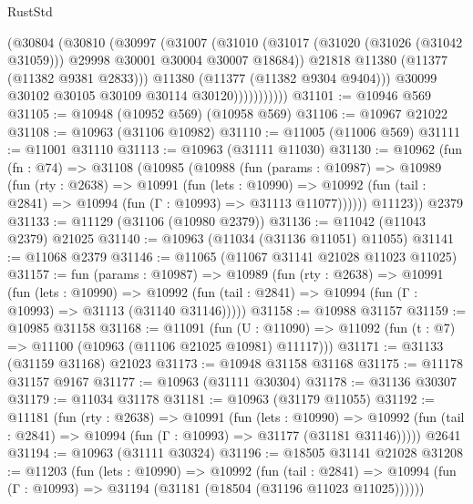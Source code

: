 \begin{lexlean}{RustStd}
\begin{coremodule}
                      (@30804
                        (@30810
                          (@30997
                            (@31007
                              (@31010
                                (@31017
                                  (@31020 (@31026 (@31042 @31059)))
                                  @29998
                                  @30001
                                  @30004
                                  @30007
                                  @18684))
                              @21818
                              @11380
                              (@11377 (@11382 @9381 @2833)))
                            @11380
                            (@11377 (@11382 @9304 @9404)))
                          @30099
                          @30102
                          @30105
                          @30109
                          @30114
                          @30120)))))))))))
@31101 := @10946 @569
@31105 := @10948 (@10952 @569) (@10958 @569)
@31106 := @10967 @21022
@31108 := @10963 (@31106 @10982)
@31110 := @11005 (@11006 @569)
@31111 := @11001 @31110
@31113 := @10963 (@31111 @11030)
@31130 := @10962
    (fun (fn : @74) =>
    @31108
      (@10985
        (@10988
          (fun (params : @10987) =>
          @10989
            (fun (rty : @2638) =>
            @10991
              (fun (lets : @10990) =>
              @10992 (fun (tail : @2841) => @10994 (fun (Γ : @10993) => @31113 @11077))))))
        @11123))
    @2379
@31133 := @11129 (@31106 (@10980 @2379))
@31136 := @11042 (@11043 @2379) @21025
@31140 := @10963 (@11034 (@31136 @11051) @11055)
@31141 := @11068 @2379
@31146 := @11065 (@11067 @31141 @21028 @11023 @11025)
@31157 := fun (params : @10987) =>
  @10989
    (fun (rty : @2638) =>
    @10991
      (fun (lets : @10990) =>
      @10992 (fun (tail : @2841) => @10994 (fun (Γ : @10993) => @31113 (@31140 @31146)))))
@31158 := @10988 @31157
@31159 := @10985 @31158
@31168 := @11091
    (fun (U : @11090) => @11092 (fun (t : @7) => @11100 (@10963 (@11106 @21025 @10981) @11117)))
@31171 := @31133 (@31159 @31168) @21023
@31173 := @10948 @31158 @31168
@31175 := @11178 @31157 @9167
@31177 := @10963 (@31111 @30304)
@31178 := @31136 @30307
@31179 := @11034 @31178
@31181 := @10963 (@31179 @11055)
@31192 := @11181
    (fun (rty : @2638) =>
    @10991
      (fun (lets : @10990) =>
      @10992 (fun (tail : @2841) => @10994 (fun (Γ : @10993) => @31177 (@31181 @31146)))))
    @2641
@31194 := @10963 (@31111 @30324)
@31196 := @18505 @31141 @21028
@31208 := @11203
    (fun (lets : @10990) =>
    @10992
      (fun (tail : @2841) =>
      @10994 (fun (Γ : @10993) => @31194 (@31181 (@18504 (@31196 @11023 @11025))))))

\end{coremodule}
\end{lexlean}
